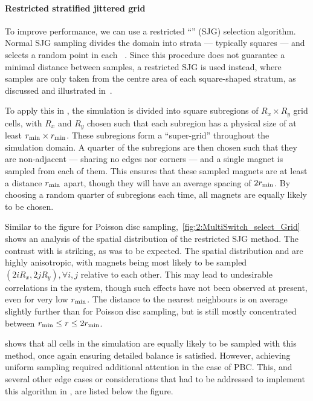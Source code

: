 \paragraph{Restricted stratified jittered grid}
To improve performance, we can use a restricted ``'' (SJG) selection algorithm.
Normal SJG sampling divides the domain into strata --- typically squares --- and selects a random point in each ~\cite{ProgressiveMultiJittered}.
Since this procedure does not guarantee a minimal distance between samples, a restricted SJG is used instead, where samples are only taken from the centre area of each square-shaped stratum, as discussed and illustrated in~. \par %
To apply this in \hotspice, the simulation is divided into square subregions of $R_x \times R_y$ grid cells, with $R_x$ and $R_y$ chosen such that each subregion has a physical size of at least $r_\mathrm{min} \times r_\mathrm{min}$.
These subregions form a ``super-grid'' throughout the simulation domain.
A quarter of the subregions are then chosen such that they are non-adjacent --- sharing no edges nor corners --- and a single magnet is sampled from each of them. %
This ensures that these sampled magnets are at least a distance $r_\mathrm{min}$ apart, though they will have an average spacing of $2r_\mathrm{min}$.
By choosing a random quarter of subregions each time, all magnets are equally likely to be chosen. \\\par

Similar to the figure for Poisson disc sampling,~\cref{fig:2:MultiSwitch_select_Grid} shows an analysis of the spatial distribution of the restricted SJG method.
The contrast with  is striking, as was to be expected.
The spatial distribution and  are highly anisotropic, with magnets being most likely to be sampled $(2iR_x, 2jR_y), \forall i,j$ relative to each other.
This may lead to undesirable correlations in the system, though such effects have not been observed at present, even for very low $r_\mathrm{min}$.
The distance to the nearest neighbours is on average slightly further than for Poisson disc sampling, but is still mostly concentrated between $r_\mathrm{min} \leq r \leq 2r_\mathrm{min}$. \par
{} shows that all cells in the simulation are equally likely to be sampled with this method, once again ensuring detailed balance is satisfied.
However, achieving uniform sampling required additional attention in the case of PBC.
This, and several other edge cases or considerations that had to be addressed to implement this algorithm in \hotspice, are listed below the figure.

